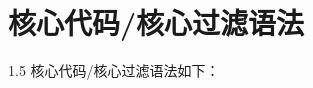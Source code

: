 \documentclass[a4paper,12pt]{report}
\begin{document}
\section{核心代码/核心过滤语法}
\songti
\begin{spacing}{1.5}
核心代码/核心过滤语法如下：


\end{spacing}



	

	


	
	

		
\end{document}
